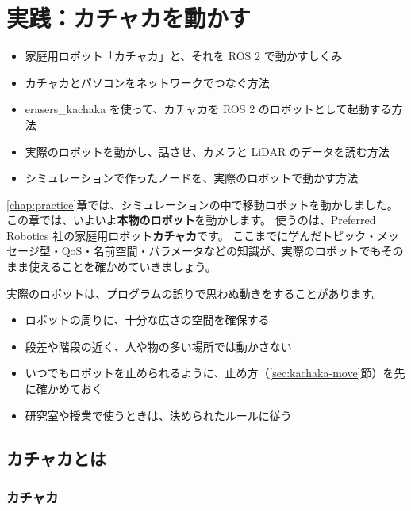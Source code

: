 \chapter{実践：カチャカを動かす}
\label{chap:kachaka}

\begin{goalbox}
  \begin{itemize}
    \item 家庭用ロボット「カチャカ」と、それを ROS 2 で動かすしくみ
    \item カチャカとパソコンをネットワークでつなぐ方法
    \item erasers\_kachaka を使って、カチャカを ROS 2 のロボットとして起動する方法
    \item 実際のロボットを動かし、話させ、カメラと LiDAR のデータを読む方法
    \item シミュレーションで作ったノードを、実際のロボットで動かす方法
  \end{itemize}
\end{goalbox}

\ref{chap:practice}章では、シミュレーションの中で移動ロボットを動かしました。
この章では、いよいよ\textbf{本物のロボット}を動かします。
使うのは、Preferred Robotics 社の家庭用ロボット\textbf{カチャカ}です。
ここまでに学んだトピック・メッセージ型・QoS・名前空間・パラメータなどの知識が、実際のロボットでもそのまま使えることを確かめていきましょう。

\begin{caution}[実際のロボットを動かすとき]
  実際のロボットは、プログラムの誤りで思わぬ動きをすることがあります。
  \begin{itemize}
    \item ロボットの周りに、十分な広さの空間を確保する
    \item 段差や階段の近く、人や物の多い場所では動かさない
    \item いつでもロボットを止められるように、止め方（\ref{sec:kachaka-move}節）を先に確かめておく
    \item 研究室や授業で使うときは、決められたルールに従う
  \end{itemize}
\end{caution}

\section{カチャカとは}
\label{sec:kachaka-intro}

\subsection{カチャカ}

